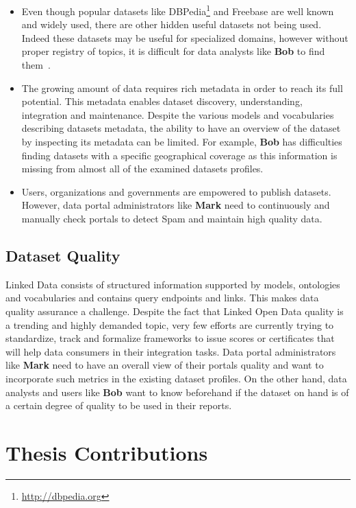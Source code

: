 \begin{itemize}
	\item Even though popular datasets like DBPedia\footnote{\url{http://dbpedia.org}} and Freebase are well known and widely used, there are other hidden useful datasets not being used. Indeed these datasets may be useful for specialized domains, however without proper registry of topics, it is difficult for data analysts like \textbf{Bob} to find them~\cite{Lalithsena:WI:13}.
	\item The growing amount of data requires rich metadata in order to reach its full potential. This metadata enables dataset discovery, understanding, integration and maintenance. Despite the various models and vocabularies describing datasets metadata, the ability to have an overview of the dataset by inspecting its metadata can be limited. For example, \textbf{Bob} has difficulties finding datasets with a specific geographical coverage as this information is missing from almost all of the examined datasets profiles.
	\item Users, organizations and governments are empowered to publish datasets. However, data portal administrators like \textbf{Mark} need to continuously and manually check portals to detect Spam and maintain high quality data.
\end{itemize}

\subsection{Dataset Quality}

Linked Data consists of structured information supported by models, ontologies and vocabularies and contains query endpoints and links. This makes data quality assurance a challenge. Despite the fact that Linked Open Data quality is a trending and highly demanded topic, very few efforts are currently trying to standardize, track and formalize frameworks to issue scores or certificates that will help data consumers in their integration tasks. Data portal administrators like \textbf{Mark} need to have an overall view of their portals quality and want to incorporate such metrics in the existing dataset profiles. On the other hand, data analysts and users like \textbf{Bob} want to know beforehand if the dataset on hand is of a certain degree of quality to be used in their reports.

\section{Thesis Contributions} \label{section:contribution}

